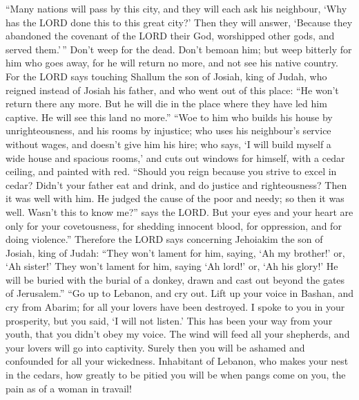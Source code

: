  ``Many nations will pass by this city, and they will each
ask his neighbour, `Why has the LORD done this to this great city?'
 Then they will answer, `Because they abandoned the
covenant of the LORD their God, worshipped other gods, and served
them.'\,''  Don't weep for the dead. Don't bemoan him;
but weep bitterly for him who goes away, for he will return no more, and
not see his native country.  For the LORD says touching
Shallum the son of Josiah, king of Judah, who reigned instead of Josiah
his father, and who went out of this place: ``He won't return there any
more.  But he will die in the place where they have led
him captive. He will see this land no more.''  ``Woe to
him who builds his house by unrighteousness, and his rooms by injustice;
who uses his neighbour's service without wages, and doesn't give him his
hire;  who says, `I will build myself a wide house and
spacious rooms,' and cuts out windows for himself, with a cedar ceiling,
and painted with red.  ``Should you reign because you
strive to excel in cedar? Didn't your father eat and drink, and do
justice and righteousness? Then it was well with him.  He
judged the cause of the poor and needy; so then it was well. Wasn't this
to know me?'' says the LORD.  But your eyes and your
heart are only for your covetousness, for shedding innocent blood, for
oppression, and for doing violence.''  Therefore the LORD
says concerning Jehoiakim the son of Josiah, king of Judah: ``They won't
lament for him, saying, `Ah my brother!' or, `Ah sister!' They won't
lament for him, saying `Ah lord!' or, `Ah his glory!'  He
will be buried with the burial of a donkey, drawn and cast out beyond
the gates of Jerusalem.''  ``Go up to Lebanon, and cry
out. Lift up your voice in Bashan, and cry from Abarim; for all your
lovers have been destroyed.  I spoke to you in your
prosperity, but you said, `I will not listen.' This has been your way
from your youth, that you didn't obey my voice.  The wind
will feed all your shepherds, and your lovers will go into captivity.
Surely then you will be ashamed and confounded for all your wickedness.
 Inhabitant of Lebanon, who makes your nest in the
cedars, how greatly to be pitied you will be when pangs come on you, the
pain as of a woman in travail!

